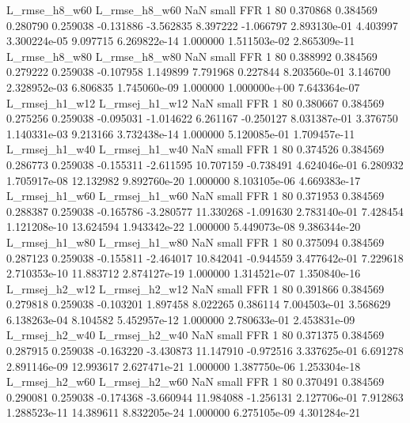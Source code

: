  L_rmse_h8_w60  L_rmse_h8_w60                   NaN      small      FFR                 1 80 0.370868       0.384569 0.280790       0.259038   -0.131886     -3.562835      8.397222    -1.066797   2.893130e-01  4.403997 3.300224e-05     9.097715   6.269822e-14            1.000000    1.511503e-02        2.865309e-11
 L_rmse_h8_w80  L_rmse_h8_w80                   NaN      small      FFR                 1 80 0.388992       0.384569 0.279222       0.259038   -0.107958      1.149899      7.791968     0.227844   8.203560e-01  3.146700 2.328952e-03     6.806835   1.745060e-09            1.000000    1.000000e+00        7.643364e-07
L_rmsej_h1_w12 L_rmsej_h1_w12                   NaN      small      FFR                 1 80 0.380667       0.384569 0.275256       0.259038   -0.095031     -1.014622      6.261167    -0.250127   8.031387e-01  3.376750 1.140331e-03     9.213166   3.732438e-14            1.000000    5.120085e-01        1.709457e-11
L_rmsej_h1_w40 L_rmsej_h1_w40                   NaN      small      FFR                 1 80 0.374526       0.384569 0.286773       0.259038   -0.155311     -2.611595     10.707159    -0.738491   4.624046e-01  6.280932 1.705917e-08    12.132982   9.892760e-20            1.000000    8.103105e-06        4.669383e-17
L_rmsej_h1_w60 L_rmsej_h1_w60                   NaN      small      FFR                 1 80 0.371953       0.384569 0.288387       0.259038   -0.165786     -3.280577     11.330268    -1.091630   2.783140e-01  7.428454 1.121208e-10    13.624594   1.943342e-22            1.000000    5.449073e-08        9.386344e-20
L_rmsej_h1_w80 L_rmsej_h1_w80                   NaN      small      FFR                 1 80 0.375094       0.384569 0.287123       0.259038   -0.155811     -2.464017     10.842041    -0.944559   3.477642e-01  7.229618 2.710353e-10    11.883712   2.874127e-19            1.000000    1.314521e-07        1.350840e-16
L_rmsej_h2_w12 L_rmsej_h2_w12                   NaN      small      FFR                 1 80 0.391866       0.384569 0.279818       0.259038   -0.103201      1.897458      8.022265     0.386114   7.004503e-01  3.568629 6.138263e-04     8.104582   5.452957e-12            1.000000    2.780633e-01        2.453831e-09
L_rmsej_h2_w40 L_rmsej_h2_w40                   NaN      small      FFR                 1 80 0.371375       0.384569 0.287915       0.259038   -0.163220     -3.430873     11.147910    -0.972516   3.337625e-01  6.691278 2.891146e-09    12.993617   2.627471e-21            1.000000    1.387750e-06        1.253304e-18
L_rmsej_h2_w60 L_rmsej_h2_w60                   NaN      small      FFR                 1 80 0.370491       0.384569 0.290081       0.259038   -0.174368     -3.660944     11.984088    -1.256131   2.127706e-01  7.912863 1.288523e-11    14.389611   8.832205e-24            1.000000    6.275105e-09        4.301284e-21
